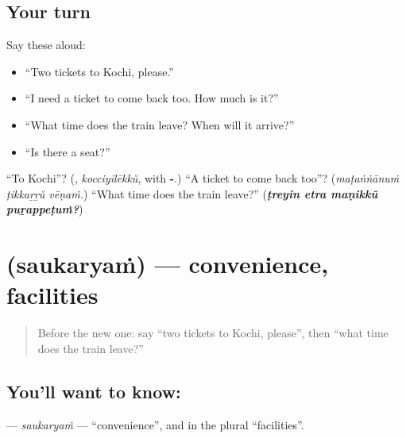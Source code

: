 \subsection*{Your turn}
Say these aloud:

\begin{itemize}
\raggedright
  \item \textquotedblleft{}Two tickets to Kochi, please.\textquotedblright{}
  \item \textquotedblleft{}I need a ticket to come back too. How much is it?\textquotedblright{}
  \item \textquotedblleft{}What time does the train leave? When will it arrive?\textquotedblright{}
  \item \textquotedblleft{}Is there a seat?\textquotedblright{}
\end{itemize}

\begin{tcolorbox}[breakable,colback=teal!4,colframe=teal!35!black,title={Before you move on}]
\textquotedblleft{}To Kochi\textquotedblright{}? (\textbf{}, \emph{kocciyilēkkŭ}, with \textbf{-}.) \textquotedblleft{}A ticket to come back too\textquotedblright{}? (\emph{maṭaṅṅānuṁ ṭikkaṟṟŭ vēṇaṁ.}) \textquotedblleft{}What time does the train leave?\textquotedblright{} (\emph{\textbf{ṭreyin etra maṇikkŭ puṟappeṭuṁ?}})
\end{tcolorbox}
\section[\texorpdfstring{\ml{സൗകര്യം} (saukaryaṁ)}{സൗകര്യം (saukaryaṁ)}]{ (saukaryaṁ) — convenience, facilities}

\label{lesson:ML-C344-saukaryam}



\begin{quote}
Before the new one: say \textquotedblleft{}two tickets to Kochi, please\textquotedblright{}, then \textquotedblleft{}what time does the train leave?\textquotedblright{}
\end{quote}

\subsection*{You'll want to know: }
\textbf{} — \emph{saukaryaṁ} — \textquotedblleft{}convenience\textquotedblright{}, and in the plural \textquotedblleft{}facilities\textquotedblright{}.

